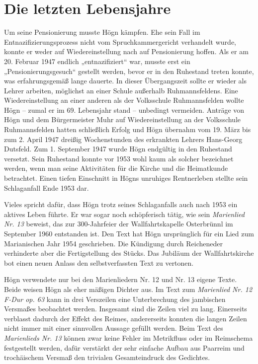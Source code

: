 \section{Die letzten Lebensjahre}

Um seine Pensionierung musste Högn kämpfen. Ehe sein Fall im
Entnazifizierungsprozess nicht vom Spruchkammergericht verhandelt
wurde, konnte er weder auf Wiedereinstellung nach auf Pensionierung
hoffen. Als er am 20. Februar 1947 endlich „entnazifiziert“ war, musste
erst ein „Pensionierungsgesuch“ gestellt werden, bevor er in den
Ruhestand treten konnte, was erfahrungsgemäß lange dauerte. In dieser
Übergangszeit sollte er wieder als Lehrer arbeiten, möglichst an einer
Schule außerhalb Ruhmannsfeldens. Eine Wiedereinstellung an einer
anderen als der Volksschule Ruhmannsfelden wollte Högn – zumal er im
69. Lebensjahr stand – unbedingt vermeiden. Anträge von Högn und dem
Bürgermeister Muhr auf Wiedereinstellung an der Volksschule
Ruhmannsfelden hatten schließlich Erfolg und Högn übernahm vom 19. März
bis zum 2. April 1947 dreißig Wochenstunden des erkrankten Lehrers
Hans-Georg Dutsfeld. Zum 1. September 1947 wurde Högn endgültig in den
Ruhestand versetzt. Sein Ruhestand konnte vor 1953 wohl kaum als
solcher bezeichnet werden, wenn man seine Aktivitäten für die Kirche
und die Heimatkunde betrachtet. Einen tiefen Einschnitt in Högns
unruhiges Rentnerleben stellte sein Schlaganfall Ende 1953 dar.

Vieles spricht dafür, dass Högn trotz seines Schlaganfalls auch nach
1953 ein aktives Leben führte. Er war sogar noch schöpferisch tätig,
wie sein \textit{Marienlied Nr. 13} beweist, das zur 300-Jahrfeier
der Wallfahrtskapelle Osterbrünnl im September 1960 entstanden ist.
Den Text hat Högn ursprünglich für ein Lied zum Marianischen Jahr 1954
geschrieben. Die Kündigung durch Reicheneder verhinderte aber die
Fertigstellung des Stücks. Das Jubiläum der Wallfahrtskirche bot einen
neuen Anlass den selbstverfassten Text zu vertonen.

Högn verwendete nur bei den Marienliedern Nr. 12 und Nr. 13 eigene
Texte. Beide weisen Högn als eher mäßigen Dichter aus. Im Text zum
\textit{Marienlied Nr. 12 F-Dur op. 63} kann in drei Verszeilen eine
Unterbrechung des jambischen Versmaßes beobachtet werden. Insgesamt
sind die Zeilen viel zu lang. Einerseits verblasst dadurch der Effekt
des Reimes, andererseits konnten die langen Zeilen nicht immer mit
einer sinnvollen Aussage gefüllt werden. Beim Text des
\textit{Marienlieds Nr. 13} können zwar keine Fehler im Metrikfluss
oder im Reimschema festgestellt werden, dafür verstärkt der sehr
einfache Aufbau aus Paarreim und trochäischem Versmaß den trivialen
Gesamteindruck des Gedichtes.

